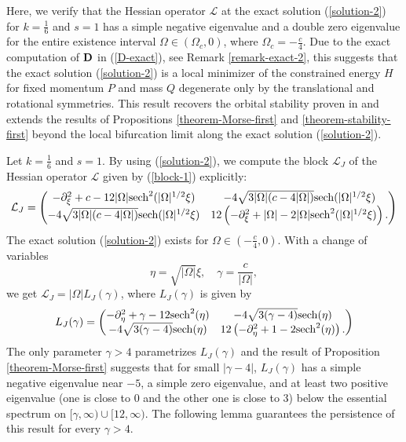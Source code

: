 \documentclass[12pt,reqno]{amsart}
\numberwithin{equation}{section}
\begin{document}
Here, we verify that the Hessian operator $\mathcal{L}$ 
at the exact solution (\ref{solution-2}) for $k = \frac{1}{6}$ and $s = 1$ has 
a simple negative eigenvalue and a double zero eigenvalue for the entire existence 
interval $\Omega \in (\Omega_c,0)$, where $\Omega_c = -\frac{c}{4}$. Due to the exact computation 
of ${\bf D}$ in (\ref{D-exact}), see Remark \ref{remark-exact-2}, 
this suggests that the exact solution (\ref{solution-2}) is a local 
minimizer of the constrained energy $H$ for fixed momentum $P$ and mass $Q$ degenerate only by the translational and rotational symmetries. This result 
recovers the orbital stability proven in \cite{Chen} and extends the results of Propositions \ref{theorem-Morse-first} and \ref{theorem-stability-first} beyond the local 
bifurcation limit along the exact solution (\ref{solution-2}).

Let $k = \frac{1}{6}$ and $s = 1$. By using (\ref{solution-2}), we compute the block $\mathcal{L}_J$ of the Hessian operator $\mathcal{L}$ given by (\ref{block-1}) explicitly:
\begin{equation*}
\mathcal{L}_J = \begin{pmatrix} -\partial_{\xi}^2 + c - 12 |\Omega| {\rm sech}^2(|\Omega|^{1/2} \xi)  & -4 \sqrt{3|\Omega|(c - 4 |\Omega|)} {\rm sech}(|\Omega|^{1/2} \xi)  \\ -4 \sqrt{3|\Omega|(c - 4 |\Omega|)} {\rm sech}(|\Omega|^{1/2} \xi) & 
12 \left( - \partial_{\xi}^2 + |\Omega| - 2 |\Omega| {\rm sech}^2(|\Omega|^{1/2} \xi) \right).
\end{pmatrix}
\end{equation*}
The exact solution (\ref{solution-2}) exists for $\Omega \in \left( -\frac{c}{4},0\right)$. With a change of variables 
$$
\eta = \sqrt{|\Omega|} \xi, \quad \gamma = \frac{c}{|\Omega|}, 
$$
we get $\mathcal{L}_J = |\Omega| L_J(\gamma)$, where $L_J(\gamma)$ is given by 
\begin{equation}
    \label{Hessian-exact-normalized}
L_J(\gamma) = \begin{pmatrix} -\partial_{\eta}^2 + \gamma - 12 {\rm sech}^2(\eta)  & -4 \sqrt{3 (\gamma - 4)} {\rm sech}(\eta)  \\ -4 \sqrt{3 (\gamma - 4)} {\rm sech}(\eta)  & 
12 \left( - \partial_{\eta}^2 + 1 - 2 {\rm sech}^2(\eta) \right).
\end{pmatrix}
\end{equation}
The only parameter $\gamma > 4$ parametrizes $L_J(\gamma)$ and the result of Proposition \ref{theorem-Morse-first} suggests 
that for small $|\gamma - 4|$, $L_J(\gamma)$ has a simple negative eigenvalue near $-5$, a simple zero eigenvalue, and at least two positive 
eigenvalue (one is close to $0$ and the other one is close to $3$) below the essential spectrum 
on $[\gamma,\infty) \cup [12,\infty)$. 
The following lemma guarantees the persistence of this result for every $\gamma > 4$. 
\end{document}
